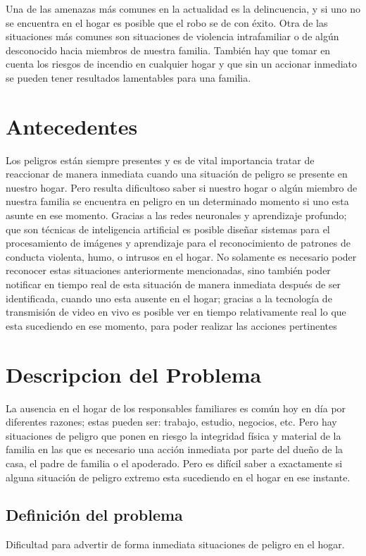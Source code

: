 Una de las amenazas más comunes en la actualidad es la delincuencia, y si uno no se encuentra en el hogar es posible que el robo se de con éxito. Otra de las situaciones más comunes son situaciones de violencia intrafamiliar o de algún desconocido hacia miembros de nuestra familia. También hay que tomar en cuenta los riesgos de incendio en cualquier hogar y que sin un accionar inmediato se pueden tener resultados lamentables para una familia.\\

\section{Antecedentes}
Los peligros están siempre presentes y es de vital importancia tratar de reaccionar de manera inmediata cuando una situación de peligro se presente en nuestro hogar. Pero resulta dificultoso saber si nuestro hogar o algún miembro de nuestra familia se encuentra en peligro en un determinado momento si uno esta asunte en ese momento.
Gracias a las redes neuronales y aprendizaje profundo; que son técnicas de inteligencia artificial es posible diseñar sistemas para el procesamiento de imágenes y aprendizaje para el reconocimiento de patrones de conducta violenta, humo, o intrusos en el hogar.
No solamente es necesario poder reconocer estas situaciones anteriormente mencionadas, sino también poder notificar en tiempo real de esta situación de manera inmediata después de ser identificada, cuando uno esta ausente en el hogar; gracias a la tecnología de transmisión de video en vivo es posible ver en tiempo relativamente real lo que esta sucediendo en ese momento, para poder realizar las acciones pertinentes

\section{Descripcion del Problema}
La ausencia en el hogar de los responsables familiares es común hoy en día por diferentes razones; 
estas pueden ser: trabajo, estudio, negocios, etc. 
Pero hay situaciones de peligro que ponen en riesgo la integridad física y material de la familia en las que es necesario una acción inmediata por parte del dueño de la casa, el padre de familia o el apoderado. Pero es difícil saber a exactamente si alguna situación de peligro extremo esta sucediendo en el hogar en ese instante.

\subsection{Definición del problema}
Dificultad para advertir de forma inmediata situaciones de peligro en el hogar.

